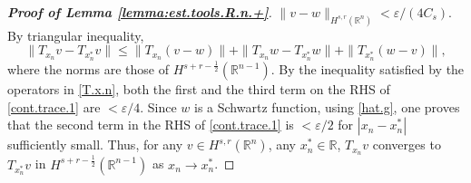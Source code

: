 \documentclass[10pt,reqno,a4paper]{article}
\numberwithin{equation}{section}
\theoremstyle{plain}
\theoremstyle{definition}
\newcommand{\R}{{\mathbb R}}
\newcommand{\e}{\varepsilon}
\begin{document}
\begin{proof}[\textbf{Proof of Lemma \ref{lemma:est.tools.R.n.+}}]
$\| v-w \|_{H^{s,r}(\R^n)} < \e / (4 C_s)$. 
By triangular inequality, 
\begin{equation} \label{cont.trace.1}
\| T_{x_n} v - T_{x_n^*} v \| 
\leq \| T_{x_n} (v-w) \| + \| T_{x_n} w - T_{x_n^*} w \| + \| T_{x_n^*} (w-v) \|, 
\end{equation}
where the norms are those of $H^{s+r-\frac12}(\R^{n-1})$. 
By the inequality satisfied by the operators in \eqref{T.x.n}, 
both the first and the third term on the RHS of \eqref{cont.trace.1} are $< \e/4$. 
Since $w$ is a Schwartz function, using \eqref{hat.g}, one proves that 
the second term in the RHS of \eqref{cont.trace.1} 
is $< \e/2$ for $|x_n-x_n^*|$ sufficiently small. 
Thus, for any $v \in H^{s,r}(\R^n)$, any $x_n^* \in \R$, 
$T_{x_n} v$ converges to $T_{x_n^*} v$ 
in $H^{s+r-\frac12}(\R^{n-1})$ as $x_n \to x_n^*$. 



\end{proof}
\end{document}
